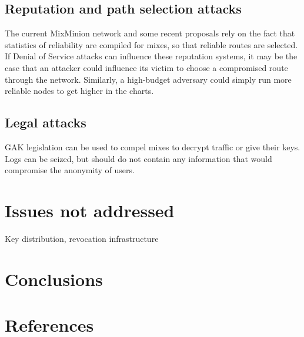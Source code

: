 \documentclass{article}
\begin{document}
\subsection{Reputation and path selection attacks}

The current MixMinion network and some recent proposals rely on the
fact that statistics of reliability are compiled for mixes, so that
reliable routes are selected. If Denial of Service attacks can
influence these reputation systems, it may be the case that an
attacker could influence its victim to choose a compromised route
through the network. Similarly, a high-budget adversary could simply
run more reliable nodes to get higher in the charts.

\subsection{Legal attacks}

GAK legislation can be used to compel mixes to decrypt traffic or give
their keys. Logs can be seized, but should do not contain any
information that would compromise the anonymity of users.

\section{Issues not addressed}

Key distribution, revocation infrastructure

\section{Conclusions}
\section{References}
\end{document}
